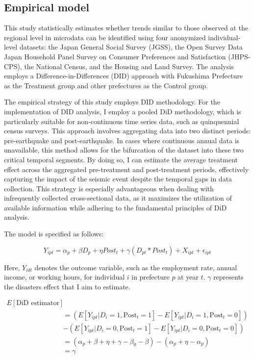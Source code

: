 \documentclass[a4paper,12pt]{article}
\begin{document}
\subsection{Empirical model}

This study statistically estimates whether trends similar to those observed at the regional level in microdata can be identified using four anonymized individual-level datasets: the Japan General Social Survey (JGSS), the Open Survey Data Japan Household Panel Survey on Consumer Preferences and Satisfaction (JHPS-CPS), the National Census, and the Housing and Land Survey. The analysis employs a Difference-in-Differences (DID) approach with Fukushima Prefecture as the Treatment group and other prefectures as the Control group.

The empirical strategy of this study employs DID methodology. For the implementation of DID analysis, I employ a pooled DiD methodology, which is particularly suitable for non-continuous time series data, such as quinquennial census surveys. This approach involves aggregating data into two distinct periods: pre-earthquake and post-earthquake. In cases where continuous annual data is unavailable, this method allows for the bifurcation of the dataset into these two critical temporal segments. By doing so, I can estimate the average treatment effect across the aggregated pre-treatment and post-treatment periods, effectively capturing the impact of the seismic event despite the temporal gaps in data collection. This strategy is especially advantageous when dealing with infrequently collected cross-sectional data, as it maximizes the utilization of available information while adhering to the fundamental principles of DiD analysis.

The model is specified as follows:

\begin{equation}
Y_{ipt} = \alpha_{p} + \beta D_{p} + \eta Post_{t} + \gamma (D_{pt} * Post_{t}) + X_{ipt} + \epsilon_{ipt}
\end{equation}

Here, \( Y_{idt} \) denotes the outcome variable, such as the employment rate, annual income, or working hours, for individual \( i \) in prefecture \( p \) at year \( t \). \( \gamma \) represents the disasters effect that I aim to estimate. 

\begin{equation}
\begin{aligned}
E[\text{DiD estimator}] \\
&= (E[Y_{ipt}|D_i = 1, \text{Post}_t = 1] - E[Y_{ipt}|D_i = 1, \text{Post}_t = 0]) \\
&- (E[Y_{ipt}|D_i = 0, \text{Post}_t = 1] - E[Y_{ipt}|D_i = 0, \text{Post}_t = 0]) \\
&= (\alpha_{p} + \beta + \eta + \gamma - \beta_0 - \beta) - (\alpha_{p} + \eta - \alpha_{p}) \\
&= \gamma
\end{aligned}
\end{equation}
\end{document}
